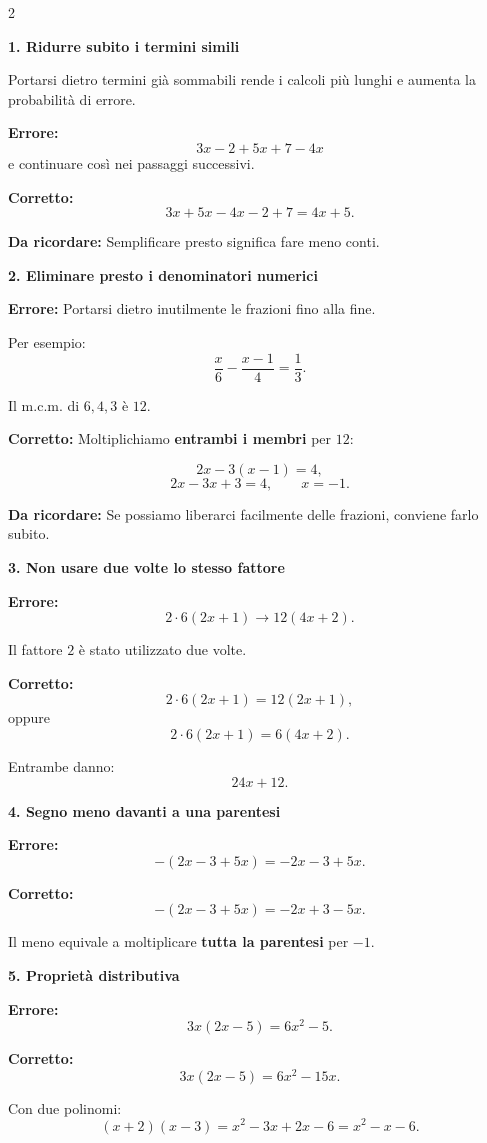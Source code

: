 \documentclass[9pt,a4paper]{extarticle}
\newcommand{\err}[1]{%
	{\color{errore}\textbf{Errore:}} #1
}
\newcommand{\corr}[1]{%
	{\color{corretto}\textbf{Corretto:}} #1
}
\newcommand{\regola}[1]{%
	{\color{titolo}\textbf{Da ricordare:}} #1
}
\newcommand{\voce}[1]{%
	\vspace{3pt}
	{\color{titolo}\textbf{#1}}\par
	\vspace{1pt}
}
\begin{document}
\begin{multicols}{2}
\small

\voce{1. Ridurre subito i termini simili}

Portarsi dietro termini già sommabili rende i calcoli più lunghi
e aumenta la probabilità di errore.

\err{
\[
3x-2+5x+7-4x
\]
e continuare così nei passaggi successivi.
}

\corr{
\[
3x+5x-4x-2+7=4x+5.
\]
}

\regola{Semplificare presto significa fare meno conti.}

\voce{2. Eliminare presto i denominatori numerici}

\err{Portarsi dietro inutilmente le frazioni fino alla fine.}

Per esempio:
\[
\frac{x}{6}-\frac{x-1}{4}=\frac13.
\]

Il m.c.m. di $6,4,3$ è $12$.

\corr{Moltiplichiamo \textbf{entrambi i membri} per $12$:}
\[
2x-3(x-1)=4,
\]
\[
2x-3x+3=4,
\qquad
x=-1.
\]

\regola{Se possiamo liberarci facilmente delle frazioni,
conviene farlo subito.}

\voce{3. Non usare due volte lo stesso fattore}

\err{
\[
2\cdot6(2x+1)
\longrightarrow
12(4x+2).
\]
}

Il fattore $2$ è stato utilizzato due volte.

\corr{
\[
2\cdot6(2x+1)=12(2x+1),
\]
oppure
\[
2\cdot6(2x+1)=6(4x+2).
\]
}

Entrambe danno:
\[
24x+12.
\]

\voce{4. Segno meno davanti a una parentesi}

\err{
\[
-(2x-3+5x)=-2x-3+5x.
\]
}

\corr{
\[
-(2x-3+5x)=-2x+3-5x.
\]
}

Il meno equivale a moltiplicare \textbf{tutta la parentesi} per $-1$.

\voce{5. Proprietà distributiva}

\err{
\[
3x(2x-5)=6x^2-5.
\]
}

\corr{
\[
3x(2x-5)
=6x^2-15x.
\]
}

Con due polinomi:
\[
(x+2)(x-3)
=x^2-3x+2x-6
=x^2-x-6.
\]


\end{multicols}
\end{document}
